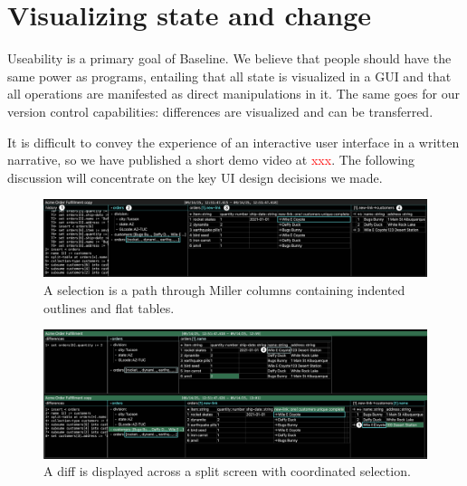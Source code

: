 \documentclass[english,submission]{programming}
\theoremstyle{definition}
\begin{document}



\section{Visualizing state and change}\label{GUI}

Useability is a primary goal of Baseline. We believe that people should have the same power as programs, entailing that all state is visualized in a GUI and that all operations are manifested as direct manipulations in it. The same goes for our version control capabilities: differences are visualized and can be transferred.

It is difficult to convey the experience of an interactive user interface in a written narrative, so we have published a short demo video at \textcolor{red}{xxx}. The following discussion will concentrate on the key UI design decisions we made.

\begin{figure}
\includegraphics[width=\textwidth]{GUInumbered.png}
\caption{A selection is a path through Miller columns containing indented outlines and flat tables.}
\label{fig:GUI}
\end{figure}

\begin{figure}
\includegraphics[width=\textwidth]{DiffNumbered.png}
\caption{A diff is displayed across a split screen with coordinated selection.}
\label{fig:Diff}
\end{figure}
\end{document}
